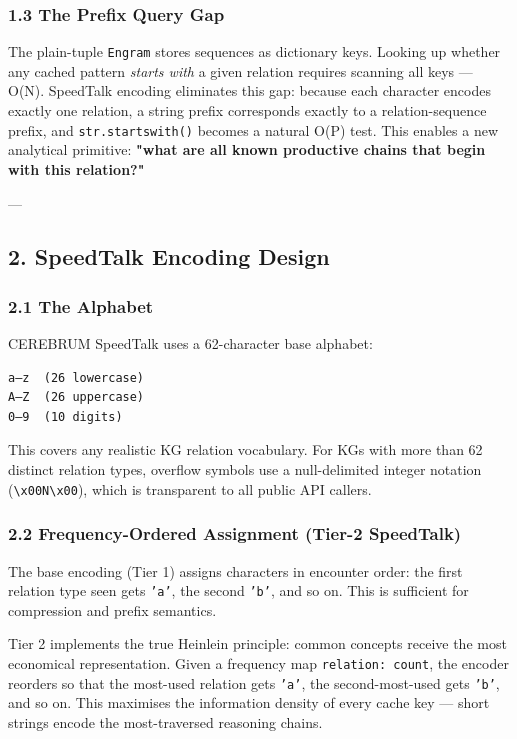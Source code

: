 \subsubsection{1.3 The Prefix Query Gap}

The plain-tuple \texttt{Engram} stores sequences as dictionary keys.  Looking up whether
any cached pattern \textit{starts with} a given relation requires scanning all keys — O(N).
SpeedTalk encoding eliminates this gap: because each character encodes exactly one
relation, a string prefix corresponds exactly to a relation-sequence prefix, and
\texttt{str.startswith()} becomes a natural O(P) test.  This enables a new analytical
primitive: \textbf{"what are all known productive chains that begin with this relation?"}

---

\subsection{2. SpeedTalk Encoding Design}

\subsubsection{2.1 The Alphabet}

CEREBRUM SpeedTalk uses a 62-character base alphabet:

\begin{lstlisting}
a–z  (26 lowercase)
A–Z  (26 uppercase)
0–9  (10 digits)
\end{lstlisting}

This covers any realistic KG relation vocabulary.  For KGs with more than 62
distinct relation types, overflow symbols use a null-delimited integer notation
(\texttt{\textbackslash x00N\textbackslash x00}), which is transparent to all public API callers.

\subsubsection{2.2 Frequency-Ordered Assignment (Tier-2 SpeedTalk)}

The base encoding (Tier 1) assigns characters in encounter order: the first relation
type seen gets \texttt{'a'}, the second \texttt{'b'}, and so on.  This is sufficient for
compression and prefix semantics.

Tier 2 implements the true Heinlein principle: \textit{}common concepts receive the most
economical repre\-sentation\textit{}.  Given a frequency map \texttt{{relation: count}}, the encoder
reorders so that the most-used relation gets \texttt{'a'}, the second-most-used gets \texttt{'b'},
and so on.  This maximises the information density of every cache key — short strings
encode the most-traversed reasoning chains.

